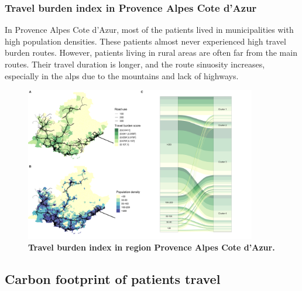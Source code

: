 \subsubsection{Travel burden index in Provence Alpes Cote d'Azur}

In Provence Alpes Cote d'Azur, most of the patients lived in municipalities
with high population densities. These patients almost never experienced
high travel burden routes. However, patients living in rural areas are often
far from the main routes. Their travel duration is longer, and the route
sinuosity increases, especially in the alps due to the mountains and lack
of highways.

\begin{figure}[H]
    \includegraphics[width=0.9\textwidth]{images/routes/fig4_93.png}
    \centering
    \caption{
        \textbf{Travel burden index in region Provence Alpes Cote d'Azur.}
    }
    \label{fig:routes-burden-index-paca}
\end{figure}

\subsection{Carbon footprint of patients travel}

